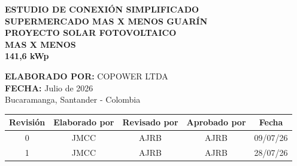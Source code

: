 \documentclass[12pt,a4paper,oneside]{book}
\begin{document}
\begin{titlepage}
    \centering
    \vspace*{2cm}
    
    {\Large \textbf{ESTUDIO DE CONEXIÓN SIMPLIFICADO}}\\[0.5cm]
    {\Large \textbf{SUPERMERCADO MAS X MENOS GUARÍN}}\\[1cm]
    
    {\Large \textbf{PROYECTO SOLAR FOTOVOLTAICO}}\\[0.3cm]
    {\LARGE \textbf{MAS X MENOS}}\\[0.3cm]
    {\LARGE \textbf{141,6 kWp}}\\[2cm]
    
    \vfill
    
    {\large \textbf{ELABORADO POR:} COPOWER LTDA}\\[0.5cm]
    {\large \textbf{FECHA:} Julio de 2026}\\[1cm]
    
    {\large Bucaramanga, Santander - Colombia}
    
    \vfill
    
    \begin{tabular}{|c|c|c|c|c|}
    \hline
    \rowcolor{lightgray}
    \textbf{Revisión} & \textbf{Elaborado por} & \textbf{Revisado por} & \textbf{Aprobado por} & \textbf{Fecha} \\
    \hline
    0 & JMCC & AJRB & AJRB & 09/07/26 \\
    \hline
    1 & JMCC & AJRB & AJRB & 28/07/26 \\
    \hline
    \end{tabular}
    
\end{titlepage}

\tableofcontents
\newpage

\listoffigures
\newpage

\listoftables
\newpage






\end{document}
